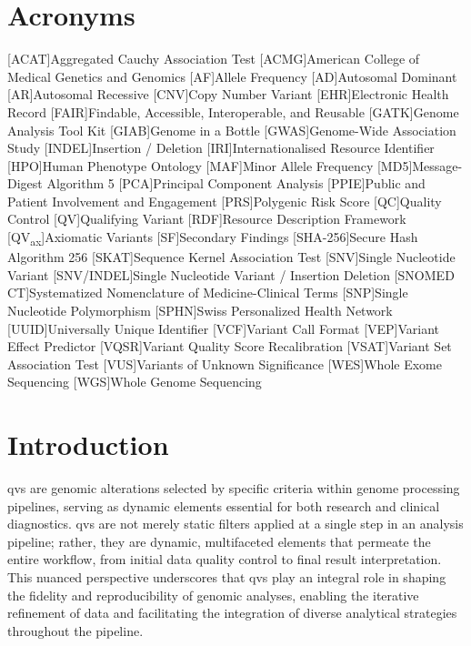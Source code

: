 \section*{Acronyms}
\renewenvironment{description}
{\list{}{\labelwidth0pt\itemindent-\leftmargin
    \parsep-1em\itemsep0pt\let\makelabel\descriptionlabel}}
               {\endlist}
\begin{acronym} 
 [ACAT]{Aggregated Cauchy Association Test }
 [ACMG]{American College of Medical Genetics and Genomics}
 [AF]{Allele Frequency}
 [AD]{Autosomal Dominant}
 [AR]{Autosomal Recessive}
  [CNV]{Copy Number Variant}
  [EHR]{Electronic Health Record}
 [FAIR]{Findable, Accessible, Interoperable, and Reusable}
 [GATK]{Genome Analysis Tool Kit}
  [GIAB]{Genome in a Bottle}
 [GWAS]{Genome-Wide Association Study}
 [INDEL]{Insertion / Deletion}
 [IRI]{Internationalised Resource Identifier}
 [HPO]{Human Phenotype Ontology}
 [MAF]{Minor Allele Frequency}
  [MD5]{Message-Digest Algorithm 5}
  [PCA]{Principal Component Analysis} 
 [PPIE]{Public and Patient Involvement and Engagement}
 [PRS]{Polygenic Risk Score} 
 [QC]{Quality Control}
 [QV]{Qualifying Variant}
 [RDF]{Resource Description Framework}
 [QV\textsubscript{ax}]{Axiomatic Variants}
 [SF]{Secondary Findings}
 [SHA-256]{Secure Hash Algorithm 256}
 [SKAT]{Sequence Kernel Association Test} 
 [SNV]{Single Nucleotide Variant}
  [SNV/INDEL]{Single Nucleotide Variant / Insertion Deletion}
  [SNOMED CT]{Systematized Nomenclature of Medicine-Clinical Terms}
 [SNP]{Single Nucleotide Polymorphism}
 [SPHN]{Swiss Personalized Health Network}
 [UUID]{Universally Unique Identifier}
 [VCF]{Variant Call Format}
  [VEP]{Variant Effect Predictor}
 [VQSR]{Variant Quality Score Recalibration}
 [VSAT]{Variant Set Association Test}
 [VUS]{Variants of Unknown Significance}
 [WES]{Whole Exome Sequencing}
 [WGS]{Whole Genome Sequencing}
\end{acronym}

\clearpage

\section{Introduction}
\label{sec:intro}
\ac{qv}s are genomic alterations selected by specific criteria within genome processing pipelines, serving as dynamic elements essential for both research and clinical diagnostics. 
\ac{qv}s are not merely static filters applied at a single step in an analysis pipeline; rather, they are dynamic, multifaceted elements that permeate the entire workflow, from initial data quality control to final result interpretation. This nuanced perspective underscores that \ac{qv}s play an integral role in shaping the fidelity and reproducibility of genomic analyses, enabling the iterative refinement of data and facilitating the integration of diverse analytical strategies throughout the pipeline.

